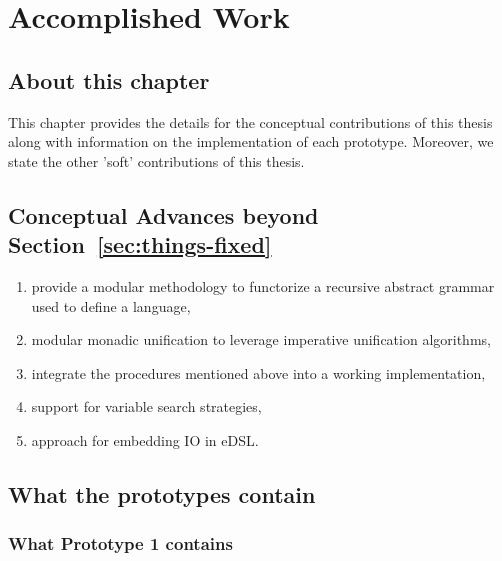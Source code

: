 \documentclass[thesis-solanki.tex]{subfiles}
\begin{document}
\chapter{Accomplished Work}\label{chap:accomplishedWork}

\section{About this chapter}\label{sec:what-this-chapter:accomplishedWork}
This chapter provides the details for the conceptual contributions of this thesis along with information on the implementation of each 
prototype. Moreover, we state the other 'soft' contributions of this thesis.



\section{Conceptual Advances beyond Section~\ref{sec:things-fixed}}\label{sec:advances:accomplishedWork}

\begin{enumerate}
\item provide a modular methodology to functorize a recursive abstract grammar used to define a language,

\item modular monadic unification to leverage imperative unification algorithms,

\item integrate the procedures mentioned above into a working  implementation,

\item support for variable search strategies,

\item approach for embedding IO in eDSL.

\end{enumerate}

\section{What the prototypes contain}
\subsection{What Prototype 1 contains}
\end{document}
